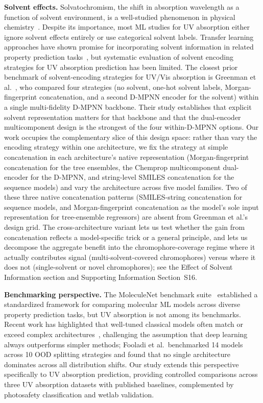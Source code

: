 \documentclass[journal=jcisd8,manuscript=article]{achemso}
\newcommand{\added}[1]{{\color{addedblue}#1}}
\newcommand{\removed}[1]{{\color{removedred}#1}}
\begin{document}
\textbf{Solvent effects.}
Solvatochromism, the shift in absorption wavelength as a function of solvent environment, is a well-studied phenomenon in physical chemistry~\cite{reichardt2011solvents}.
Despite its importance, most ML studies for UV absorption either ignore solvent effects entirely or use categorical solvent labels.
Transfer learning approaches have shown promise for incorporating solvent information in related property prediction tasks~\cite{vermeire2021transfer}\removed{, but systematic evaluation of solvent encoding strategies for UV absorption prediction has been limited}.\added{ The closest prior benchmark of solvent-encoding strategies for UV/Vis absorption is Greenman et al.~\cite{greenman2022multifidelity}, who compared four strategies (no solvent, one-hot solvent labels, Morgan-fingerprint concatenation, and a second D-MPNN encoder for the solvent) within a single multi-fidelity D-MPNN backbone. Their study establishes that explicit solvent representation matters for that backbone and that the dual-encoder multicomponent design is the strongest of the four within-D-MPNN options. Our work occupies the complementary slice of this design space: rather than vary the encoding strategy within one architecture, we fix the strategy at simple concatenation in each architecture's native representation (Morgan-fingerprint concatenation for the tree ensembles, the Chemprop multicomponent dual-encoder for the D-MPNN, and string-level SMILES concatenation for the sequence models) and vary the architecture across five model families. Two of these three native concatenation patterns (SMILES-string concatenation for sequence models, and Morgan-fingerprint concatenation as the model's sole input representation for tree-ensemble regressors) are absent from Greenman et al.'s design grid. The cross-architecture variant lets us test whether the gain from concatenation reflects a model-specific trick or a general principle, and lets us decompose the aggregate benefit into the chromophore-coverage regime where it actually contributes signal (multi-solvent-covered chromophores) versus where it does not (single-solvent or novel chromophores); see the Effect of Solvent Information section and Supporting Information Section~S16.}

\textbf{Benchmarking perspective.}
The MoleculeNet benchmark suite~\cite{wuMoleculeNet2018} established a standardized framework for comparing molecular ML models across diverse property prediction tasks, but UV absorption is not among its benchmarks.
Recent work has highlighted that well-tuned classical models often match or exceed complex architectures~\cite{panapitiya2022evaluation, walters2021applications, fooladi2025evaluating}, challenging the assumption that deep learning always outperforms simpler methods; Fooladi et al.\ benchmarked 14 models across 10 OOD splitting strategies and found that no single architecture dominates across all distribution shifts.
Our study extends this perspective specifically to UV absorption prediction, providing controlled comparisons across three UV absorption datasets with published baselines, complemented by photosafety classification and wetlab validation.
\end{document}
